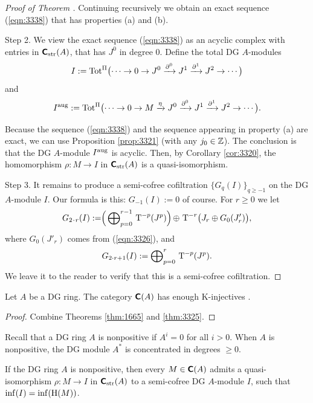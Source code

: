\begin{proof}[Proof of Theorem \tup{\ref{thm:3325}}]
Continuing recursively we obtain an exact sequence (\ref{eqn:3338}) that has 
properties (a) and (b). 

\medskip \noindent 
Step 2. We view the exact sequence (\ref{eqn:3338}) as an acyclic complex with 
entries in $\boldsymbol{\mathsf{C}}_{\mathrm{str}}(A)$, that has $J^0$ in degree $0$. 
Define the total DG $A$-modules 
\[ I :=\operatorname{Tot}^{\Pi} \bigl( \cdots \to 0 \to
J^0 \xrightarrow{\partial^0} J^1 \xrightarrow{\partial^1} J^2 \to \cdots  \bigr) \]
and 
\[ I^{\mathrm{aug}} := \operatorname{Tot}^{\Pi} \bigl( \cdots \to 0 \to M \xrightarrow{\eta} 
J^0 \xrightarrow{\partial^0} J^1 \xrightarrow{\partial^1} J^2 \to \cdots  \bigr) . \]

Because the sequence (\ref{eqn:3338}) and the sequence appearing in property 
(a) are exact, we can use Proposition \ref{prop:3321} (with any 
$j_0 \in \mathbb{Z}$). The conclusion is that the DG $A$-module $I^{\mathrm{aug}}$ is 
acyclic. Then, by Corollary \ref{cor:3320}, the homomorphism 
$\rho : M \to I$ in $\boldsymbol{\mathsf{C}}_{\mathrm{str}}(A)$ is a quasi-isomorphism. 

\medskip \noindent
Step 3. It remains to produce a semi-cofree cofiltration 
$\{ G_q(I) \}_{q \geq -1}$ on the DG $A$-module $I$. Our formula is this: 
$G_{-1}(I) := 0$ of course. For $r \geq 0$ we let 
\[ G_{2 \mspace{1.5mu}{\cdot}\mspace{1.5mu} r}(I) := 
\Bigr( \bigoplus\nolimits_{p = 0}^{r - 1} \, \operatorname{T}^{-p} (J^p) \Bigl) 
\, \oplus \, \operatorname{T}^{-r} \bigl( J_r \oplus G_0(J'_r) \bigr) , \]
where $G_0(J'_r)$ comes from (\ref{eqn:3326}), and 
\[ G_{2 {\cdot} r + 1}(I)  := 
\bigoplus\nolimits_{p = 0}^{r} \, \operatorname{T}^{-p} (J^p) . \]
We leave it to the reader to verify that this is a semi-cofree cofiltration. 
\end{proof}

\begin{cor} \label{cor:1665}
Let $A$ be a DG ring. The category $\operatorname{\boldsymbol{\mathsf{C}}}(A)$ has 
enough K-in\-jectives%
.
\end{cor}

\begin{proof}
Combine Theorems \ref{thm:1665} and \ref{thm:3325}. 
\end{proof}

Recall that a DG ring $A$ is nonpositive if $A^i = 0$ for all $i > 0$. 
When $A$ is nonpositive, the DG module $A^*$ is concentrated in 
degrees $\geq 0$. 

\begin{cor} \label{cor:3345}
If the DG ring $A$ is nonpositive, then every $M \in \operatorname{\boldsymbol{\mathsf{C}}}(A)$ admits a 
quasi-iso\-morphism $\rho : M \to I$ in $\boldsymbol{\mathsf{C}}_{\mathrm{str}}(A)$ to a 
semi-cofree DG $A$-module $I$, such that 
$\operatorname{inf}(I) = \operatorname{inf}(\operatorname{H}(M))$. 
\end{cor}


